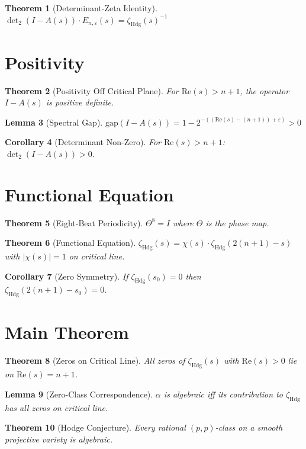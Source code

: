 \documentclass[12pt]{article}
\newtheorem{theorem}{Theorem}[section]
\newtheorem{lemma}[theorem]{Lemma}
\newtheorem{corollary}[theorem]{Corollary}
\begin{document}
\begin{theorem}[Determinant-Zeta Identity]
$\det_2(I - A(s)) \cdot E_{n,\varepsilon}(s) = \zeta_{\text{Hdg}}(s)^{-1}$
\end{theorem}

\section{Positivity}

\begin{theorem}[Positivity Off Critical Plane]
For $\text{Re}(s) > n+1$, the operator $I - A(s)$ is positive definite.
\end{theorem}

\begin{lemma}[Spectral Gap]
$\text{gap}(I - A(s)) = 1 - 2^{-((\text{Re}(s)-(n+1))+\varepsilon)} > 0$
\end{lemma}

\begin{corollary}[Determinant Non-Zero]
For $\text{Re}(s) > n+1$: $\det_2(I - A(s)) > 0$.
\end{corollary}

\section{Functional Equation}

\begin{theorem}[Eight-Beat Periodicity]
$\Theta^8 = I$ where $\Theta$ is the phase map.
\end{theorem}

\begin{theorem}[Functional Equation]
$\zeta_{\text{Hdg}}(s) = \chi(s) \cdot \zeta_{\text{Hdg}}(2(n+1) - s)$ with $|\chi(s)| = 1$ on critical line.
\end{theorem}

\begin{corollary}[Zero Symmetry]
If $\zeta_{\text{Hdg}}(s_0) = 0$ then $\zeta_{\text{Hdg}}(2(n+1) - s_0) = 0$.
\end{corollary}

\section{Main Theorem}

\begin{theorem}[Zeros on Critical Line]
All zeros of $\zeta_{\text{Hdg}}(s)$ with $\text{Re}(s) > 0$ lie on $\text{Re}(s) = n+1$.
\end{theorem}

\begin{lemma}[Zero-Class Correspondence]
$\alpha$ is algebraic iff its contribution to $\zeta_{\text{Hdg}}$ has all zeros on critical line.
\end{lemma}

\begin{theorem}[Hodge Conjecture]
Every rational $(p,p)$-class on a smooth projective variety is algebraic.
\end{theorem}
\end{document}
